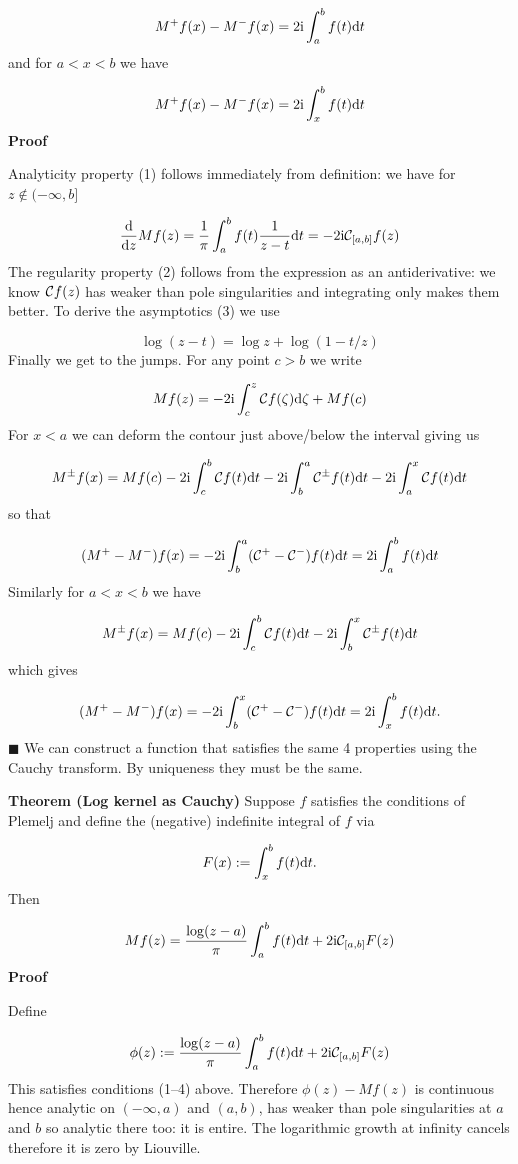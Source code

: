 \documentclass[12pt,landscape]{article}
\def\D{ {\rm d} }
\def\I{ {\rm i} }
\def\CC{ {\cal C} }
\def\dt{\D t}
\def\endash{–}
\begin{document}
{\begin{itemize}
\end{itemize}
\[
M^+f(x) - M^-f(x) = 2 \I \int_a^b f(t) \D t
\]
and for $a < x < b$ we have

\[
M^+ f(x) - M^-f(x) = 2 \I \int_x^b f(t) \D t
\]
\textbf{Proof}

Analyticity property (1) follows immediately from definition: we have for $z \notin (-\infty,b]$

\[
{\D \over \D z} M f(z) = {1 \over \pi} \int_{a}^b f(t) {1\over z -t}  \dt = -2 \I \CC_{[a,b]} f(z)
\]
The regularity property (2) follows from the expression as an antiderivative: we know $\CC f(z)$ has weaker than pole singularities and integrating only makes them better. To derive the asymptotics (3) we use

\[
\log(z - t) = \log z + \log(1 - t/z)
\]
\newpage
Finally we get to the jumps. For any point $c > b$ we write

\[
M f(z) = -2 \I \int_c^z \CC f(\zeta) \D \zeta + M f(c)
\]
For $x < a$ we can deform the contour just above/below the interval giving us

\[
M^\pm f(x) = Mf(c) -2 \I \int_c^b \CC f(t) \D t -2 \I \int_b^a \CC^\pm f(t) \D t -2 \I \int_a^x \CC f(t) \D t
\]
so that

\[
(M^+ - M^-) f(x) = -2 \I \int_b^a (\CC^+ - \CC^-) f(t) \D t  = 2 \I \int_a^b f(t) \D t
\]
Similarly for $a < x < b$ we have

\[
M^\pm f(x) = Mf(c) -2 \I \int_c^b \CC f(t) \D t -2 \I \int_b^x \CC^\pm f(t) \D t
\]
which gives

\[
(M^+ - M^-) f(x) = -2 \I \int_b^x (\CC^+ - \CC^-) f(t) \D t  = 2 \I \int_x^b f(t) \D t.
\]
\ensuremath{\blacksquare}
\newpage
We can construct a function that satisfies the same 4 properties using the Cauchy transform. By uniqueness they must be the same.

\textbf{Theorem (Log kernel as Cauchy)} Suppose $f$ satisfies the conditions of Plemelj and define the (negative) indefinite integral of $f$ via

\[
F(x) := \int_x^b f(t) \D t.
\]
Then

\[
M f(z) = {\log(z-a) \over \pi} \int_a^b f(t) \D t + 2 \I \CC_{[a,b]} F(z)
\]
\textbf{Proof}

Define

\[
\phi(z) := {\log(z-a) \over \pi} \int_a^b f(t) \D t + 2 \I \CC_{[a,b]} F(z)
\]
This satisfies conditions (1\ensuremath{\endash}4) above. Therefore $\phi(z) - M f(z)$ is continuous hence analytic on $(-\infty,a)$ and $(a,b)$, has weaker than pole singularities at $a$ and $b$ so analytic there too: it is entire. The logarithmic growth at infinity cancels therefore it is zero by Liouville.

}
\end{document}
